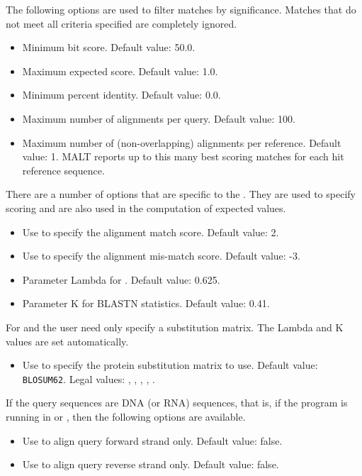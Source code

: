 \documentclass[11pt]{article}
\newcommand\MALT{{\sf MALT}\xspace}
\begin{document}
The following options are used to filter matches by significance. Matches that do not meet all criteria specified are completely ignored.
\begin{itemize}
\setlength{\itemindent}{30pt}
\item[\itt{--minBitScore}]          Minimum bit score. Default value: 50.0.
\item[\itt{--maxExpected}]           Maximum expected score. Default value: 1.0.
\item[{\itt{--minPercentIdentity}}]  Minimum percent identity. Default value: 0.0.
\item[{\itt{--maxAlignmentsPerQuery}}]  Maximum number of alignments per query. Default value: 100.
\item[{\itt{ --maxAlignmentsPerRef}}]   Maximum number of (non-overlapping) alignments  per reference. Default value: 1.
\MALT reports up to this many best scoring matches for each hit reference sequence.
\end{itemize}

{
There are a number of options that are specific to the . They are used to specify scoring and
are also used in the computation of expected values.
\begin{itemize}
\setlength{\itemindent}{30pt}
\item[\itt{--matchScore}]            Use to specify the alignment match score. Default value: 2.
\item[\itt{--mismatchScore}]        Use to specify the alignment mis-match score. Default value: -3.
\item[\itt{--setLambda}]           Parameter Lambda  for . Default value: 0.625.
\item[\itt{--setK}]                   Parameter K  for BLASTN statistics. Default value: 0.41.
\end{itemize}
}

For  and  the user need only specify a substitution matrix. The Lambda and
K values are set automatically.
\begin{itemize}
\setlength{\itemindent}{30pt}
\item[\itt{--subMatrix}] Use to specify the protein substitution matrix to use. Default value: {\tt BLOSUM62}. Legal values: 
, , , , .
\end{itemize}

If the query sequences are DNA (or RNA) sequences, that is, if the program is running in  {}
or  , then the following options are available.
\begin{itemize}
\setlength{\itemindent}{30pt}
\item[\itt{--forwardOnly}]       Use to align query forward strand only. Default value: false.
\item[\itt{ --reverseOnly}]       Use to align query reverse strand only. Default value: false.
\end{itemize}
\end{document}
